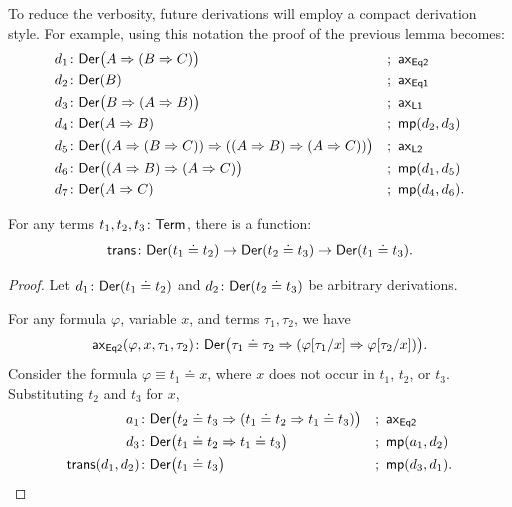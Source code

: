 \begin{rem}
    To reduce the verbosity, future derivations will employ a compact derivation style. For example, using this notation the proof of the previous lemma becomes:
    {\small
    \begin{align*}
        d_1&\colon\fun{Der}\bigl(
            A\imp(B\imp C)
        \bigr)
            &&;\ \fun{ax}_{\fun{Eq2}}\\
        d_2&\colon\fun{Der}(B)
            &&;\ \fun{ax}_{\fun{Eq1}}\\
        d_3&\colon\fun{Der}\bigl(
            B\imp(A\imp B)
        \bigr)
            &&;\ \fun{ax}_{\fun{L1}}\\
        d_4&\colon\fun{Der}(
            A\imp B
        )
            &&;\ \fun{mp}(d_2,d_3)\\
        d_5&\colon\fun{Der}\bigl(
            (A\imp(B\imp C))
            \imp
            ((A\imp B)\imp(A\imp C))
        \bigr)
            &&;\ \fun{ax}_{\fun{L2}}\\
        d_6&\colon\fun{Der}\bigl(
            (A\imp B)\imp(A\imp C)
        \bigr)
            &&;\ \fun{mp}(d_1,d_5)\\
        d_7&\colon\fun{Der}(
            A\imp C
        )
            &&;\ \fun{mp}(d_4,d_6).
    \end{align*}}
\end{rem}

\begin{lem}
    \label{lem:transitivity-equality}
    For any terms\/ $t_1,t_2,t_3\colon\fun{Term}$, there is a function:
    \[
        \fun{trans}\colon
            \fun{Der}(t_1\doteq t_2)
            \to
            \fun{Der}(t_2\doteq t_3)
            \to
            \fun{Der}(t_1\doteq t_3).
    \]
\end{lem}

\begin{proof}
    Let $d_1\colon\fun{Der}(t_1\doteq t_2)$ and $d_2\colon\fun{Der}(t_2\doteq t_3)$ be arbitrary derivations.
    
    For any formula $\varphi$, variable $x$, and terms $\tau_1,\tau_2$, we have
    \[
        \fun{ax}_{\fun{Eq2}}(\varphi,x,\tau_1,\tau_2)
            \colon
            \fun{Der}\bigl(
                \tau_1\doteq\tau_2
                \imp(
                    \varphi[\tau_1/x]\imp\varphi[\tau_2/x]
                )
            \bigr).
    \]
    Consider the formula $\varphi\equiv t_1\doteq x$, where $x$ does not occur in $t_1$, $t_2$, or $t_3$. Substituting $t_2$ and $t_3$ for $x$,
    \begin{align*}
        a_1&\colon\fun{Der}\bigl(
            t_2\doteq t_3\imp(t_1\doteq t_2\imp t_1\doteq t_3)
        \bigr)
            &&;\ \fun{ax}_{\fun{Eq2}}\\
        d_3&\colon\fun{Der}\bigl(
            t_1\doteq t_2\imp t_1\doteq t_3
        \bigr)
            &&;\ \fun{mp}(a_1, d_2)\\
        \fun{trans}(d_1, d_2)&\colon\fun{Der}\bigl(
            t_1\doteq t_3
        \bigr)
            &&;\ \fun{mp}(d_3,d_1).
    \end{align*}
\end{proof}

